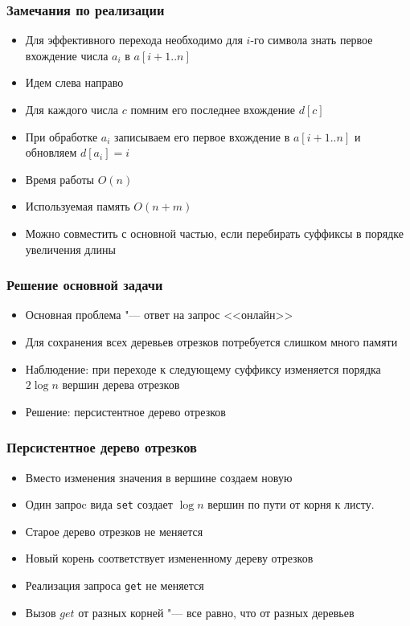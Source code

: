 \begin{frame}
  \frametitle{Замечания по реализации}
  \begin{itemize}
    \item Для эффективного перехода необходимо для $i$-го символа знать первое вхождение числа $a_i$ в $a[i+1..n]$
    \item Идем слева направо
    \item Для каждого числа $c$ помним его последнее вхождение $d[c]$
    \item При обработке $a_i$ записываем его первое вхождение в $a[i+1..n]$ и обновляем $d[a_i] = i$
    \item Время работы $O(n)$
    \item Используемая память $O(n + m)$
    \item Можно совместить с основной частью, если перебирать суффиксы в порядке увеличения длины
  \end{itemize}
\end{frame}

\begin{frame}
  \frametitle{Решение основной задачи}
  \begin{itemize}
    \item Основная проблема "--- ответ на запрос <<онлайн>>
    \item Для сохранения всех деревьев отрезков потребуется слишком много памяти
    \item Наблюдение: при переходе к следующему суффиксу изменяется порядка $2 \log n$ вершин дерева отрезков
    \item Решение: персистентное дерево отрезков
  \end{itemize}
\end{frame}

\begin{frame}
  \frametitle{Персистентное дерево отрезков}
  \begin{itemize}
    \item Вместо изменения значения в вершине создаем новую
    \item Один запроc вида \texttt{set} создает $\log n$ вершин по пути от корня к листу.
    \item Старое дерево отрезков не меняется
    \item Новый корень соответствует измененному дереву отрезков
    \item Реализация запроса \texttt{get} не меняется
    \item Вызов $get$ от разных корней "--- все равно, что от разных деревьев
  \end{itemize}
\end{frame}

